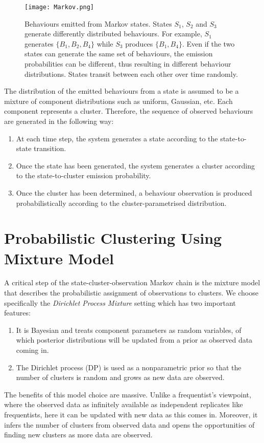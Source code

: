 \documentclass[english,a4,oneside,9pt]{extarticle}
\begin{document}
\begin{figure}[htb]
\centering
\texttt{[image: Markov.png]}
\caption{Behaviours emitted from Markov states. States $S_1$, $S_2$ and $S_3$ generate differently distributed behaviours. For example, $S_1$ generates $\{B_1, B_2, B_4\}$ while $S_3$ produces $\{ B_1, B_4\}$.
Even if the two states can generate the same set of behaviours, the emission probabilities can be different, thus resulting in different behaviour distributions. States transit between each other over time randomly.}
\label{fig:markov}
\end{figure}

The distribution of the emitted behaviours from a state is assumed to be a mixture of component distributions such as uniform, Gaussian, etc. Each component represents a cluster. Therefore, the sequence of observed behaviours are generated in the following way:
\vspace*{-2mm}
\begin{enumerate}
\item At each time step, the system generates a state according to the state-to-state transition.
\vspace*{-1mm}
\item Once the state has been generated, the system generates a cluster according to the state-to-cluster emission probability.
\vspace*{-1mm}
\item Once the cluster has been determined, a behaviour observation is produced probabilistically according to the cluster-parametrised distribution.
\end{enumerate}

\section{Probabilistic Clustering Using Mixture Model}


A critical step of the state-cluster-observation Markov chain is the mixture model that describes the probabilistic assignment of observations to clusters. We choose specifically the \textit{Dirichlet Process Mixture} setting which has two important features:
\begin{enumerate}
\item It is Bayesian and treats component parameters as random variables, of which posterior distributions will be updated from a prior as observed data coming in. 
\item The Dirichlet process (DP) is used as a nonparametric prior so that the number of clusters is random and grows as new data are observed.
\end{enumerate}
The benefits of this model choice are massive. Unlike a frequentist's viewpoint, where the observed data as infinitely available as independent replicates like frequentists, here it can be updated with new data as this comes in. Moreover, it infers the number of clusters from observed data and opens the opportunities of finding new clusters as more data are observed.
\end{document}
